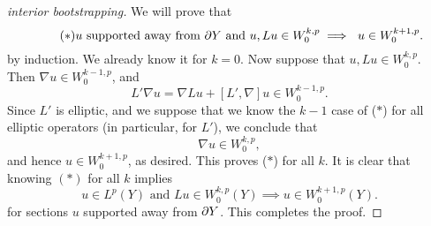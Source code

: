    \begin{proof}[interior bootstrapping]
     We will prove that
     \begin{equation*}\tag{$\ast$}
       u\text{ supported away from $\partial Y$ and $u,Lu\in
         W^{k,p}_{0}$}\implies\text{ $u\in W^{k+1,p}_{0}$}.
     \end{equation*}
     by induction. We already know it for $k=0$. Now suppose that
     $u,Lu\in W^{k,p}_{0}$. Then $\nabla u\in W^{k-1,p}_{0}$, and
     \begin{equation*}
       L'\nabla u=\nabla L u+[L',\nabla]u\in W^{k-1,p}_{0}.
     \end{equation*}
     Since $L'$ is elliptic, and we suppose that we know the $k-1$
     case of ($\ast$) for all elliptic operators (in particular, for $L'$), we conclude that
     \begin{equation*}
       \nabla u\in W^{k,p}_{0},
     \end{equation*}
     and hence $u\in W^{k+1,p}_{0}$, as desired. This proves ($\ast$)
     for all $k$. It is clear that knowing $(\ast)$ for all $k$
     implies
     \begin{equation*}
       u\in L^{p}(Y)\text{ and }Lu\in W^{k,p}_{0}(Y)\implies u\in W^{k+1,p}_{0}(Y).
     \end{equation*}
     for sections $u$
     supported away from $\partial Y$. This completes the proof.
   \end{proof}

